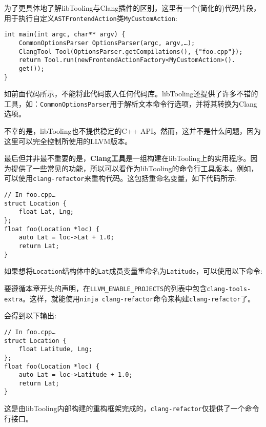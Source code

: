 为了更具体地了解libTooling与Clang插件的区别，这里有一个(简化的)代码片段，用于执行自定义\texttt{ASTFrontendAction}类\texttt{MyCustomAction}:

\begin{lstlisting}[style=styleCXX]
int main(int argc, char** argv) {
	CommonOptionsParser OptionsParser(argc, argv,…);
	ClangTool Tool(OptionsParser.getCompilations(), {"foo.cpp"});
	return Tool.run(newFrontendActionFactory<MyCustomAction>().
	get());
}
\end{lstlisting}

如前面代码所示，不能将此代码嵌入任何代码库。libTooling还提供了许多不错的工具，如：\texttt{CommonOptionsParser}用于解析文本命令行选项，并将其转换为Clang选项。

\begin{tcolorbox}[colback=blue!5!white,colframe=blue!75!black, fonttitle=\bfseries,title=libTooling的API稳定性]
\hspace*{0.7cm}不幸的是，libTooling也不提供稳定的C++ API。然而，这并不是什么问题，因为这里可以完全控制所使用的LLVM版本。
\end{tcolorbox}

最后但并非最不重要的是，\textbf{Clang工具}是一组构建在libTooling上的实用程序。因为提供了一些常见的功能，所以可以看作为libTooling的命令行工具版本。例如，可以使用\texttt{clang-refactor}来重构代码。这包括重命名变量，如下代码所示:

\begin{lstlisting}[style=styleCXX]
// In foo.cpp…
struct Location {
	float Lat, Lng;
};
float foo(Location *loc) {
	auto Lat = loc->Lat + 1.0;
	return Lat;
}
\end{lstlisting}

如果想将\texttt{Location}结构体中的\texttt{Lat}成员变量重命名为\texttt{Latitude}，可以使用以下命令:


\begin{tcolorbox}[colback=blue!5!white,colframe=blue!75!black, fonttitle=\bfseries,title=构建clang-refactor]
\hspace*{0.7cm}要遵循本章开头的声明，在\texttt{LLVM\_ENABLE\_PROJECTS}的列表中包含\texttt{clang-tools-extra}。这样，就能使用\texttt{ninja clang-refactor}命令来构建\texttt{clang-refactor}了。
\end{tcolorbox}

会得到以下输出:

\begin{lstlisting}[style=styleCXX]
// In foo.cpp…
struct Location {
	float Latitude, Lng;
};
float foo(Location *loc) {
	auto Lat = loc->Latitude + 1.0;
	return Lat;
}
\end{lstlisting}

这是由libTooling内部构建的重构框架完成的，\texttt{clang-refactor}仅提供了一个命令行接口。

























